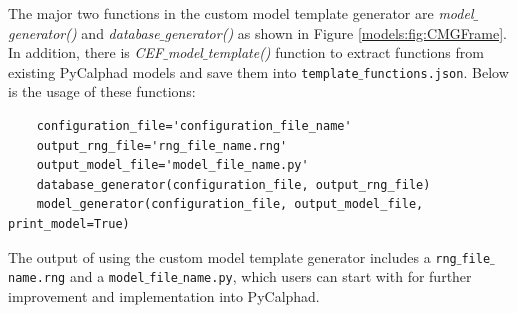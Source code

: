 The major two functions in the custom model template generator are \textit{model$\_$generator()} and \textit{database$\_$generator()} as shown in Figure \ref{models:fig:CMGFrame}. In addition, there is \textit{CEF$\_$model$\_$template()} function to extract functions from existing PyCalphad models and save them into \texttt{template$\_$functions.json}. Below is the usage of these functions:
\begin{verbatim}
    configuration_file='configuration_file_name'
    output_rng_file='rng_file_name.rng'
    output_model_file='model_file_name.py'
    database_generator(configuration_file, output_rng_file)
    model_generator(configuration_file, output_model_file, print_model=True)
\end{verbatim}
The output of using the custom model template generator includes a \texttt{rng$\_$file$\_$name.rng} and a \texttt{model$\_$file$\_$name.py}, which users can start with for further improvement and implementation into PyCalphad.

